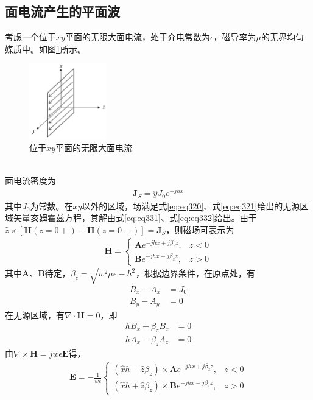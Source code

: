 \documentclass{article}
\numberwithin{equation}{section}
\begin{document}
\subsection{面电流产生的平面波}
考虑一个位于$xy$平面的无限大面电流，处于介电常数为$\epsilon$，磁导率为$\mu$的无界均匀媒质中。如图\ref{fig:fig42}所示。
\begin{figure}[ht]
    \centering
    \includegraphics[width=0.3\textwidth]{位于xy平面的无限大面电流.PNG}
    \caption{位于$xy$平面的无限大面电流}
    \label{fig:fig42}
\end{figure}
\\
面电流密度为
\begin{align}
    \label{eq:eq371}
    \mathbf{J}_S=\hat{y}J_0e^{-jhx}
\end{align}
其中$J_0$为常数。在$xy$以外的区域，场满足式\ref{eq:eq320}、式\ref{eq:eq321}给出的无源区域矢量亥姆霍兹方程，其解由式\ref{eq:eq331}、式\ref{eq:eq332}给出。由于$\hat{z}\times[\mathbf{H}(z=0+)-\mathbf{H}(z=0-)]=\mathbf{J}_S$，则磁场可表示为
\begin{align}
    \label{eq:eq372}
    \mathbf{H}=
    \left\{
        \begin{array}{lr}
            \mathbf{A}e^{-jhx+j\beta_zz}, &z<0 \\
            \mathbf{B}e^{-jhx-j\beta_zz}, &z>0
        \end{array}
    \right.
\end{align}
其中$\mathbf{A}$、$\mathbf{B}$待定，$\beta_z=\sqrt{w^2\mu\epsilon-h^2}$，根据边界条件，在原点处，有
\begin{align}
    \label{eq:eq373}
    B_x-A_x&=J_0 \\
    \label{eq:eq374}
    B_y-A_y&=0
\end{align}
在无源区域，有$\nabla\cdot\mathbf{H}=0$，即
\begin{align}
    \label{eq:eq375}
    hB_x+\beta_zB_z&=0 \\
    \label{eq:eq376}
    hA_x-\beta_zA_z&=0
\end{align}
由$\nabla\times\mathbf{H}=jw\epsilon\mathbf{E}$得，
\begin{align}
    \label{eq:eq377}
    \mathbf{E}=-\frac{1}{w\epsilon}
    \left\{
        \begin{array}{lr}
            (\hat{x}h-\hat{z}\beta_z)\times\mathbf{A}e^{-jhx+j\beta_zz}, &z<0 \\
            (\hat{x}h+\hat{z}\beta_z)\times\mathbf{B}e^{-jhx-j\beta_zz}, &z>0
        \end{array}
    \right.
\end{align}
\end{document}
